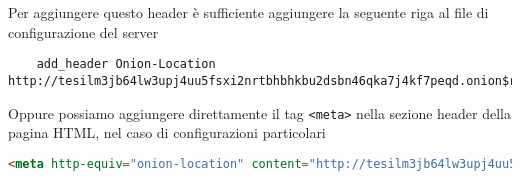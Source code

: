 Per aggiungere questo header è sufficiente aggiungere la seguente riga al file di configurazione del server
\begin{lstlisting}
    add_header Onion-Location http://tesilm3jb64lw3upj4uu5fsxi2nrtbhbhkbu2dsbn46qka7j4kf7peqd.onion$request_uri;
\end{lstlisting}
Oppure possiamo aggiungere direttamente il tag \lstinline{<meta>} nella sezione header della pagina HTML, nel caso di configurazioni particolari 
\begin{lstlisting}[language=HTML]
    <meta http-equiv="onion-location" content="http://tesilm3jb64lw3upj4uu5fsxi2nrtbhbhkbu2dsbn46qka7j4kf7peqd.onion" />
\end{lstlisting}

